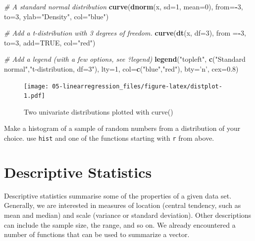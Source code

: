\documentclass[]{book}
\newenvironment{Shaded}{\begin{snugshade}}{\end{snugshade}}
\newcommand{\CommentTok}[1]{\textcolor[rgb]{0.56,0.35,0.01}{\textit{#1}}}
\newcommand{\DataTypeTok}[1]{\textcolor[rgb]{0.13,0.29,0.53}{#1}}
\newcommand{\DecValTok}[1]{\textcolor[rgb]{0.00,0.00,0.81}{#1}}
\newcommand{\FloatTok}[1]{\textcolor[rgb]{0.00,0.00,0.81}{#1}}
\newcommand{\KeywordTok}[1]{\textcolor[rgb]{0.13,0.29,0.53}{\textbf{#1}}}
\newcommand{\NormalTok}[1]{#1}
\newcommand{\OperatorTok}[1]{\textcolor[rgb]{0.81,0.36,0.00}{\textbf{#1}}}
\newcommand{\OtherTok}[1]{\textcolor[rgb]{0.56,0.35,0.01}{#1}}
\newcommand{\StringTok}[1]{\textcolor[rgb]{0.31,0.60,0.02}{#1}}
\let\BeginKnitrBlock\begin \let\EndKnitrBlock\end
\begin{document}
\begin{Shaded}
\begin{Highlighting}[]
\CommentTok{# A standard normal distribution}
\KeywordTok{curve}\NormalTok{(}\KeywordTok{dnorm}\NormalTok{(x, }\DataTypeTok{sd=}\DecValTok{1}\NormalTok{, }\DataTypeTok{mean=}\DecValTok{0}\NormalTok{), }\DataTypeTok{from=}\OperatorTok{-}\DecValTok{3}\NormalTok{, }\DataTypeTok{to=}\DecValTok{3}\NormalTok{,}
      \DataTypeTok{ylab=}\StringTok{"Density"}\NormalTok{, }\DataTypeTok{col=}\StringTok{"blue"}\NormalTok{)}

\CommentTok{# Add a t-distribution with 3 degrees of freedom.}
\KeywordTok{curve}\NormalTok{(}\KeywordTok{dt}\NormalTok{(x, }\DataTypeTok{df=}\DecValTok{3}\NormalTok{), }\DataTypeTok{from =}\OperatorTok{-}\DecValTok{3}\NormalTok{, }\DataTypeTok{to=}\DecValTok{3}\NormalTok{, }\DataTypeTok{add=}\OtherTok{TRUE}\NormalTok{, }\DataTypeTok{col=}\StringTok{"red"}\NormalTok{)}

\CommentTok{# Add a legend (with a few options, see ?legend)}
\KeywordTok{legend}\NormalTok{(}\StringTok{"topleft"}\NormalTok{, }\KeywordTok{c}\NormalTok{(}\StringTok{"Standard normal"}\NormalTok{,}\StringTok{"t-distribution, df=3"}\NormalTok{), }\DataTypeTok{lty=}\DecValTok{1}\NormalTok{, }\DataTypeTok{col=}\KeywordTok{c}\NormalTok{(}\StringTok{"blue"}\NormalTok{,}\StringTok{"red"}\NormalTok{),}
       \DataTypeTok{bty=}\StringTok{'n'}\NormalTok{, }\DataTypeTok{cex=}\FloatTok{0.8}\NormalTok{)}
\end{Highlighting}
\end{Shaded}

\begin{figure}
\centering
\texttt{[image: 05-linearregression\_files/figure-latex/distplot-1.pdf]}
\caption{\label{fig:distplot}Two univariate distributions plotted with curve()}
\end{figure}

\BeginKnitrBlock{rmdtry}
Make a histogram of a sample of random numbers from a distribution of your choice. use \texttt{hist} and one of the functions starting with \texttt{r} from above.
\EndKnitrBlock{rmdtry}

\hypertarget{descstat}{%
\section{Descriptive Statistics}\label{descstat}}

Descriptive statistics summarise some of the properties of a given data set. Generally, we are interested in measures of location (central tendency, such as mean and median) and scale (variance or standard deviation). Other descriptions can include the sample size, the range, and so on. We already encountered a number of functions that can be used to summarize a vector.
\end{document}
